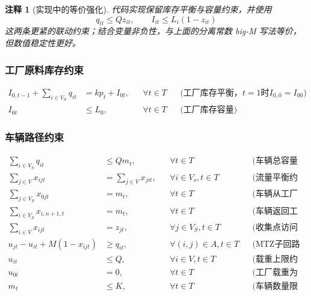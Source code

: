 \documentclass{article}
\newtheorem{remark}{注释}
\begin{document}
\begin{remark}[实现中的等价强化]
代码实现保留库存平衡与容量约束，并使用
\[
q_{it} \le Q z_{it}, \qquad I_{it} \le L_i(1-z_{it})
\]
这两条更紧的联动约束；结合变量非负性，与上面的分离常数 big-M 写法等价，但数值稳定性更好。
\end{remark}

\subsubsection{工厂原料库存约束}
\vspace{-1.5ex}
\begin{align}
I_{0,t-1} + \sum_{i \in V_S} q_{it} &= k p_t + I_{0t}, && \forall t \in T && \text{(工厂库存平衡，$t=1$时$I_{0,0}=I_{00}$)} \\
I_{0t} &\leq L_0, && \forall t \in T && \text{(工厂库存容量)}
\end{align}

\subsubsection{车辆路径约束}
\vspace{-1.5ex}
\begin{align}
\sum_{i \in V_S} q_{it} &\leq Q m_t, && \forall t \in T && \text{(车辆总容量限制)} \\
\sum_{j \in V} x_{ijt} &= \sum_{j \in V} x_{jit}, && \forall i \in V_s, t \in T && \text{(流量平衡约束)} \\
\sum_{j \in V_S} x_{0jt} &= m_t, && \forall t \in T && \text{(车辆从工厂出发)} \\
\sum_{i \in V_S} x_{i,n+1,t} &= m_t, && \forall t \in T && \text{(车辆返回工厂)} \\
\sum_{i \in V} x_{ijt} &= z_{jt}, && \forall j \in V_S, t \in T && \text{(收集点访问约束)} \\
u_{jt} - u_{it} + M(1-x_{ijt}) &\geq q_{it}, && \forall (i,j) \in A, t \in T && \text{(MTZ子回路消除)} \\
u_{it} &\leq Q, && \forall i \in V, t \in T && \text{(载重上限约束)} \\
u_{0t} &= 0, && \forall t \in T && \text{(工厂载重为零)} \\
m_t &\leq K, && \forall t \in T && \text{(车辆数量限制)}
\end{align}
\end{document}
